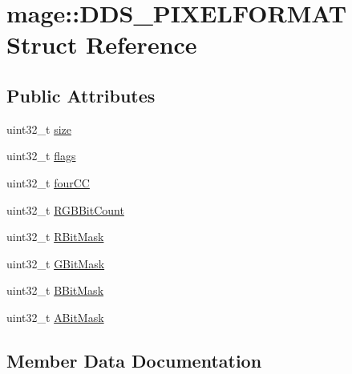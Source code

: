 \hypertarget{structmage_1_1_d_d_s___p_i_x_e_l_f_o_r_m_a_t}{}\section{mage\+:\+:D\+D\+S\+\_\+\+P\+I\+X\+E\+L\+F\+O\+R\+M\+AT Struct Reference}
\label{structmage_1_1_d_d_s___p_i_x_e_l_f_o_r_m_a_t}
\subsection*{Public Attributes}
\begin{DoxyCompactItemize}
\item 
uint32\+\_\+t \hyperlink{structmage_1_1_d_d_s___p_i_x_e_l_f_o_r_m_a_t_a75ee2fb62fda661645e254a823f619a9}{size}
\item 
uint32\+\_\+t \hyperlink{structmage_1_1_d_d_s___p_i_x_e_l_f_o_r_m_a_t_acccfb893bf7431a228b2ef79e72817b2}{flags}
\item 
uint32\+\_\+t \hyperlink{structmage_1_1_d_d_s___p_i_x_e_l_f_o_r_m_a_t_a106701459fcf09942d189bf9dcbee255}{four\+CC}
\item 
uint32\+\_\+t \hyperlink{structmage_1_1_d_d_s___p_i_x_e_l_f_o_r_m_a_t_add3b847f506039ba34a124e7cc9e9cfa}{R\+G\+B\+Bit\+Count}
\item 
uint32\+\_\+t \hyperlink{structmage_1_1_d_d_s___p_i_x_e_l_f_o_r_m_a_t_ad295cbd9c59d8e2bae97f2221bb2726f}{R\+Bit\+Mask}
\item 
uint32\+\_\+t \hyperlink{structmage_1_1_d_d_s___p_i_x_e_l_f_o_r_m_a_t_a56f79aaed7654821490a10f7941bb620}{G\+Bit\+Mask}
\item 
uint32\+\_\+t \hyperlink{structmage_1_1_d_d_s___p_i_x_e_l_f_o_r_m_a_t_ae21041782f2d3e95c2b77278668e2906}{B\+Bit\+Mask}
\item 
uint32\+\_\+t \hyperlink{structmage_1_1_d_d_s___p_i_x_e_l_f_o_r_m_a_t_a2f633f7ae47270caa66913cac7a50af3}{A\+Bit\+Mask}
\end{DoxyCompactItemize}


\subsection{Member Data Documentation}
\hypertarget{structmage_1_1_d_d_s___p_i_x_e_l_f_o_r_m_a_t_a2f633f7ae47270caa66913cac7a50af3}{}\label{structmage_1_1_d_d_s___p_i_x_e_l_f_o_r_m_a_t_a2f633f7ae47270caa66913cac7a50af3} 
